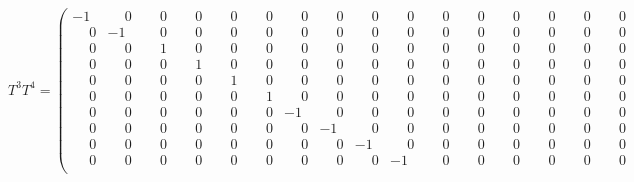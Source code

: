 \documentclass[10pt]{article}
\begin{document}
\[
T^{3}T^{4} = \left(\begin{smallmatrix}
-1 & \phantom{-}0 & \phantom{-}0 & \phantom{-}0 & \phantom{-}0 & \phantom{-}0 & \phantom{-}0 & \phantom{-}0 & \phantom{-}0 & \phantom{-}0 & \phantom{-}0 & \phantom{-}0 & \phantom{-}0 & \phantom{-}0 & \phantom{-}0 & \phantom{-}0 \\
\phantom{-}0 & -1 & \phantom{-}0 & \phantom{-}0 & \phantom{-}0 & \phantom{-}0 & \phantom{-}0 & \phantom{-}0 & \phantom{-}0 & \phantom{-}0 & \phantom{-}0 & \phantom{-}0 & \phantom{-}0 & \phantom{-}0 & \phantom{-}0 & \phantom{-}0 \\
\phantom{-}0 & \phantom{-}0 & \phantom{-}1 & \phantom{-}0 & \phantom{-}0 & \phantom{-}0 & \phantom{-}0 & \phantom{-}0 & \phantom{-}0 & \phantom{-}0 & \phantom{-}0 & \phantom{-}0 & \phantom{-}0 & \phantom{-}0 & \phantom{-}0 & \phantom{-}0 \\
\phantom{-}0 & \phantom{-}0 & \phantom{-}0 & \phantom{-}1 & \phantom{-}0 & \phantom{-}0 & \phantom{-}0 & \phantom{-}0 & \phantom{-}0 & \phantom{-}0 & \phantom{-}0 & \phantom{-}0 & \phantom{-}0 & \phantom{-}0 & \phantom{-}0 & \phantom{-}0 \\
\phantom{-}0 & \phantom{-}0 & \phantom{-}0 & \phantom{-}0 & \phantom{-}1 & \phantom{-}0 & \phantom{-}0 & \phantom{-}0 & \phantom{-}0 & \phantom{-}0 & \phantom{-}0 & \phantom{-}0 & \phantom{-}0 & \phantom{-}0 & \phantom{-}0 & \phantom{-}0 \\
\phantom{-}0 & \phantom{-}0 & \phantom{-}0 & \phantom{-}0 & \phantom{-}0 & \phantom{-}1 & \phantom{-}0 & \phantom{-}0 & \phantom{-}0 & \phantom{-}0 & \phantom{-}0 & \phantom{-}0 & \phantom{-}0 & \phantom{-}0 & \phantom{-}0 & \phantom{-}0 \\
\phantom{-}0 & \phantom{-}0 & \phantom{-}0 & \phantom{-}0 & \phantom{-}0 & \phantom{-}0 & -1 & \phantom{-}0 & \phantom{-}0 & \phantom{-}0 & \phantom{-}0 & \phantom{-}0 & \phantom{-}0 & \phantom{-}0 & \phantom{-}0 & \phantom{-}0 \\
\phantom{-}0 & \phantom{-}0 & \phantom{-}0 & \phantom{-}0 & \phantom{-}0 & \phantom{-}0 & \phantom{-}0 & -1 & \phantom{-}0 & \phantom{-}0 & \phantom{-}0 & \phantom{-}0 & \phantom{-}0 & \phantom{-}0 & \phantom{-}0 & \phantom{-}0 \\
\phantom{-}0 & \phantom{-}0 & \phantom{-}0 & \phantom{-}0 & \phantom{-}0 & \phantom{-}0 & \phantom{-}0 & \phantom{-}0 & -1 & \phantom{-}0 & \phantom{-}0 & \phantom{-}0 & \phantom{-}0 & \phantom{-}0 & \phantom{-}0 & \phantom{-}0 \\
\phantom{-}0 & \phantom{-}0 & \phantom{-}0 & \phantom{-}0 & \phantom{-}0 & \phantom{-}0 & \phantom{-}0 & \phantom{-}0 & \phantom{-}0 & -1 & \phantom{-}0 & \phantom{-}0 & \phantom{-}0 & \phantom{-}0 & \phantom{-}0 & \phantom{-}0 \\

\end{smallmatrix}\]
\end{document}
